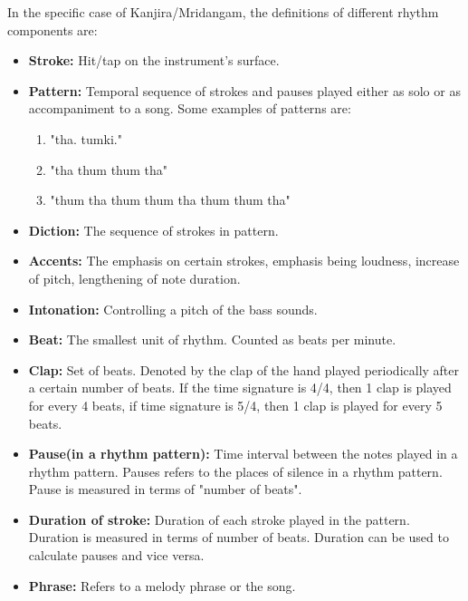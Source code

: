 
In the specific case of Kanjira/Mridangam, the definitions of different rhythm components are:

\begin{itemize}

\item \textbf{Stroke:} Hit/tap on the instrument's surface.

\item \textbf{Pattern:} Temporal sequence of strokes and pauses played either as solo or as accompaniment to a song. Some examples of patterns are:

\begin{enumerate}

\item "tha. tumki."
\item "tha thum thum tha"
\item "thum tha thum thum tha thum thum tha"

\end{enumerate}

\item \textbf{Diction:} The sequence of strokes in pattern.

\item \textbf{Accents:} The emphasis on certain strokes, emphasis being loudness, increase of pitch, lengthening of note duration.

\item \textbf{Intonation:} Controlling a pitch of the bass sounds.

\item \textbf{Beat:} The smallest unit of rhythm. Counted as beats per minute. 

\item \textbf{Clap:} Set of beats. Denoted by the clap of the hand played periodically after a certain number of beats. If the time signature is 4/4, then 1 clap is played for every 4 beats, if time signature is 5/4, then 1 clap is played for every 5 beats.

\item \textbf{Pause(in a rhythm pattern):} Time interval between the notes played in a rhythm pattern. Pauses refers to the places of silence in a rhythm pattern. Pause is measured in terms of "number of beats". 

\item \textbf{Duration of stroke:} Duration of each stroke played in the pattern. Duration is measured in terms of number of beats. Duration can be used to calculate pauses and vice versa.  

\item \textbf{Phrase:} Refers to a melody phrase or the song.

\end{itemize}
